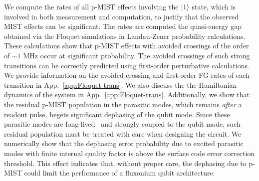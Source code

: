 \documentclass[%
reprint,
superscriptaddress,
 amsmath,amssymb,
 aps,
 prx,
longbibliography,
floatfix,
]{revtex4-2}
\newcommand{\singh}[1]{{\color{orange}{{}#1}}}%
\begin{document}
We compute the rates of all p-MIST effects involving the $\ket{1}$ state, which is involved in both measurement and computation, to justify that the observed MIST effects can be significant. The rates are computed the quasi-energy gap obtained via the Floquet simulations in Landau-Zener probability calculations. These calculations show that p-MIST effects with avoided crossings of the order of $\sim 1$ MHz occur at significant probability. The avoided crossings of such strong transitions can be correctly predicted using first-order perturbative calculations. We provide information on the avoided crossing and first-order FG rates of each transition in App.~\ref{app:Floquet-trans}. We also discuss the the Hamiltonian dynamics of the system in App.~\ref{app:Floquet-trans}.
Additionally, we show that the residual p-MIST population in the parasitic modes, which remains \textit{after} a readout pulse, begets significant dephasing of the qubit mode. Since these parasitic modes are long-lived~\cite{masluk_microwave_2012} and strongly coupled to the qubit mode, such residual population must be treated with care when designing the circuit. We numerically show that the dephasing error probability due to excited parasitic modes with finite internal quality factor is above the surface code error correction threshold. This effect indicates that, without proper care, the dephasing due to p-MIST could limit the performance of a fluxonium qubit architecture.
\end{document}

